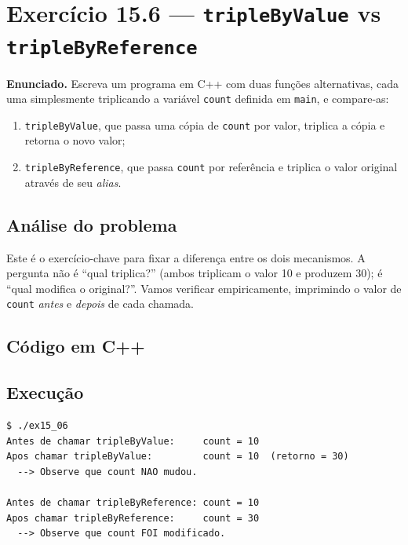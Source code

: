 \documentclass[11pt,a4paper]{article}
\begin{document}
\section{Exerc\'icio 15.6 --- \texttt{tripleByValue} vs \texttt{tripleByReference}}

\begin{enunciado}
\textbf{Enunciado.} Escreva um programa em C++ com duas fun\c{c}\~oes alternativas, cada uma simplesmente triplicando a vari\'avel \texttt{count} definida em \texttt{main}, e compare-as:
\begin{enumerate}[label=(\alph*)]
  \item \texttt{tripleByValue}, que passa uma c\'opia de \texttt{count} por valor, triplica a c\'opia e retorna o novo valor;
  \item \texttt{tripleByReference}, que passa \texttt{count} por refer\^encia e triplica o valor original atrav\'es de seu \emph{alias}.
\end{enumerate}
\end{enunciado}

\subsection*{An\'alise do problema}

Este \'e o exerc\'icio-chave para fixar a diferen\c{c}a entre os dois mecanismos. A pergunta n\~ao \'e ``qual triplica?'' (ambos triplicam o valor 10 e produzem 30); \'e ``qual modifica o original?''. Vamos verificar empiricamente, imprimindo o valor de \texttt{count} \emph{antes} e \emph{depois} de cada chamada.

\subsection*{C\'odigo em C++}



\subsection*{Execu\c{c}\~ao}

\begin{saidabox}
\begin{lstlisting}[style=terminal]
$ ./ex15_06
Antes de chamar tripleByValue:     count = 10
Apos chamar tripleByValue:         count = 10  (retorno = 30)
  --> Observe que count NAO mudou.

Antes de chamar tripleByReference: count = 10
Apos chamar tripleByReference:     count = 30
  --> Observe que count FOI modificado.
\end{lstlisting}
\end{saidabox}
\end{document}
